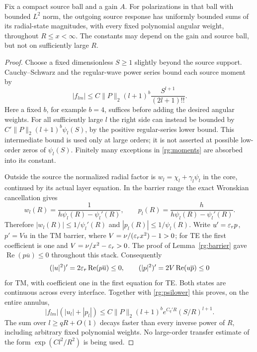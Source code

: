 \begin{lemma}\label{rg:states}
Fix a compact source ball and a gain $A$. For polarizations in
that ball with bounded $L^2$ norm, the outgoing source response
has uniformly bounded sums of its radial-state magnitudes,
with every fixed polynomial angular weight, throughout
$R\leq x<\infty$. The constants may depend on the gain and
source ball, but not on sufficiently large $R$.
\end{lemma}
\begin{proof}
Choose a fixed dimensionless $S\geq1$ slightly beyond the source
support. Cauchy--Schwarz and the regular-wave power series bound
each source moment by
\begin{equation}\label{rg:moments}
 |f_{lm}|\leq C\|P\|_2(l+1)^b
                   \frac{S^{l+1}}{(2l+1)!!}.
\end{equation}
Here a fixed $b$, for example $b=4$, suffices before adding
the desired angular weights. For all sufficiently large $l$
the right side can instead be bounded by
$C'\|P\|_2(l+1)^b\psi_l(S)$, by the positive regular-series
lower bound. This intermediate bound is used only at large
orders; it is not asserted at possible low-order zeros of
$\psi_l(S)$. Finitely many exceptions in \eqref{rg:moments}
are absorbed into its constant.

Outside the source the normalized radial factor is
$w_l=\chi_l+\gamma_l\psi_l$ in the core, continued by its
actual layer equation. In the barrier range the exact
Wronskian cancellation gives
\begin{equation}\label{rg:wcancellation}
 w_l(R)=\frac1{h\psi_l(R)-\psi_l'(R)},\qquad
 p_l(R)=\frac{h}{h\psi_l(R)-\psi_l'(R)}.
\end{equation}
Therefore $|w_l(R)|\leq1/\psi_l'(R)$ and
$|p_l(R)|\leq1/\psi_l(R)$.
Write $u'=\varepsilon_rp$, $p'=Vu$ in the TM barrier, where
$V=\nu/(\varepsilon_rx^2)-1>0$; for TE the first coefficient is one
and $V=\nu/x^2-\varepsilon_r>0$. The proof of
Lemma~\ref{rg:barrier} gave
$\operatorname{Re}(p\overline u)\leq0$ throughout this stack.
Consequently
\[
 (|u|^2)'=2\varepsilon_r\operatorname{Re}(p\overline u)\leq0,\qquad
 (|p|^2)'=2V\operatorname{Re}(u\overline p)\leq0
\]
for TM, with coefficient one in the first equation for TE.
Both states are continuous across every interface.
Together with \eqref{rg:psilower} this proves, on the entire
annulus,
\begin{equation}\label{rg:barrierstates}
 |f_{lm}|(|u_l|+|p_l|)
 \leq C\|P\|_2(l+1)^b e^{C_q'R}(S/R)^{l+1}.
\end{equation}
The sum over $l\geq qR+O(1)$ decays faster than every inverse
power of $R$, including arbitrary fixed polynomial weights.
No large-order transfer estimate of the form
$\exp(Cl^2/R^2)$ is being used.


\end{proof}
